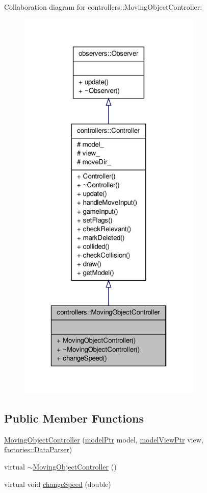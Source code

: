 \-Collaboration diagram for controllers\-:\-:\-Moving\-Object\-Controller\-:\nopagebreak
\begin{figure}[H]
\begin{center}
\leavevmode
\includegraphics[height=550pt]{d6/d5d/classcontrollers_1_1MovingObjectController__coll__graph}
\end{center}
\end{figure}
\subsection*{\-Public \-Member \-Functions}
\begin{DoxyCompactItemize}
\item 
\hyperlink{classcontrollers_1_1MovingObjectController_ae863528f0cefcef797eae0e6c2a03001}{\-Moving\-Object\-Controller} (\hyperlink{ModelView_8h_a78966ddb517fca8d2b29a2bc5c31e74e}{model\-Ptr} model, \hyperlink{Controller_8h_a8ca0a41a38eb52be242997413482c0cf}{model\-View\-Ptr} view, \hyperlink{classfactories_1_1DataParser}{factories\-::\-Data\-Parser})
\item 
virtual \hyperlink{classcontrollers_1_1MovingObjectController_a0ce7dd8eedbc7fa941d01d00d4d0b891}{$\sim$\-Moving\-Object\-Controller} ()
\item 
virtual void \hyperlink{classcontrollers_1_1MovingObjectController_a956742fda341b3b1588004fd9cde3e24}{change\-Speed} (double)
\end{DoxyCompactItemize}


